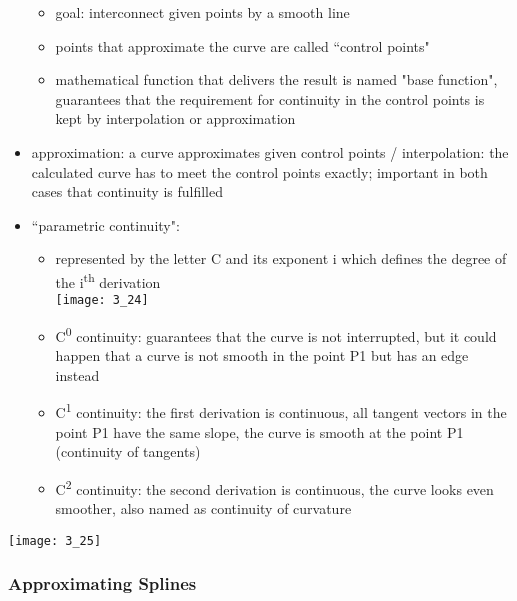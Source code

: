 \documentclass{standalone}
\begin{document}
\begin{itemize}
\begin{itemize}
		\item goal: interconnect given points by a smooth line
		\item points that approximate the curve are called ``control points"
		\item mathematical function that delivers the result is named "base function", guarantees that the requirement for continuity in the control points is kept by interpolation or approximation
	\end{itemize}
	\item approximation: a curve approximates given control points / interpolation: the calculated curve has to meet the control points exactly; important in both cases that continuity is fulfilled
	\item ``parametric continuity":
	\begin{itemize}
		\item represented by the letter C and its exponent i which defines the degree of the i\textsuperscript{th} derivation \\
		\texttt{[image: 3\_24]}
		\item C\textsuperscript{0} continuity: guarantees that the curve is not interrupted, but it could happen that a curve is not smooth in the point P1 but has an edge instead
		\item C\textsuperscript{1} continuity: the first derivation is continuous, all tangent vectors in the point P1 have the same slope, the curve is smooth at the point P1 (continuity of tangents)
		\item C\textsuperscript{2} continuity: the second derivation is continuous, the curve looks even smoother, also named as continuity of curvature
	\end{itemize}
\end{itemize}

\texttt{[image: 3\_25]}

\subsubsection*{Approximating Splines}
\end{document}
